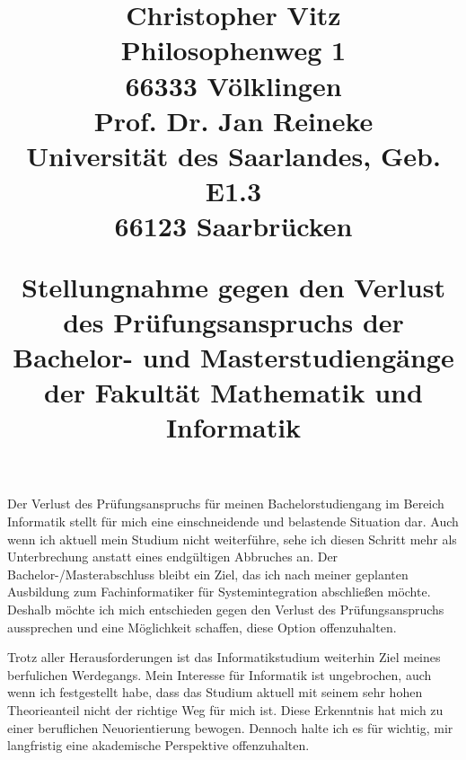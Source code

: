 \documentclass[a4paper,12pt]{article}
\title{
    \vspace{-2cm}
    \begin{flushleft}
        {\small
        Christopher Vitz\\
        Philosophenweg 1\\
        66333 Völklingen\\
        \vspace{1cm}
        Prof. Dr. Jan Reineke\\
        Universität des Saarlandes, Geb. E1.3\\
        66123 Saarbrücken\\
        }
    \end{flushleft}
    \vspace{1.5cm}
    \begin{center}
        Stellungnahme gegen den Verlust des Prüfungsanspruchs der Bachelor- und Masterstudiengänge der Fakultät Mathematik und Informatik
    \end{center}
    \vspace{-3cm}
}
\author{}
\date{}
\begin{document}
\maketitle
\vspace{1cm}
Der Verlust des Prüfungsanspruchs für meinen Bachelorstudiengang im Bereich Informatik stellt für mich eine einschneidende und belastende Situation dar.
Auch wenn ich aktuell mein Studium nicht weiterführe, sehe ich diesen Schritt mehr als Unterbrechung anstatt eines endgültigen Abbruches an.
Der Bachelor-/Masterabschluss bleibt ein Ziel, das ich nach meiner geplanten Ausbildung zum Fachinformatiker für Systemintegration abschließen möchte.
Deshalb möchte ich mich entschieden gegen den Verlust des Prüfungsanspruchs aussprechen und eine Möglichkeit schaffen, diese Option offenzuhalten.

Trotz aller Herausforderungen ist das Informatikstudium weiterhin Ziel meines berfulichen Werdegangs.
Mein Interesse für Informatik ist ungebrochen, auch wenn ich festgestellt habe, dass das Studium aktuell mit seinem sehr hohen Theorieanteil nicht der richtige Weg für mich ist.
Diese Erkenntnis hat mich zu einer beruflichen Neuorientierung bewogen.
Dennoch halte ich es für wichtig, mir langfristig eine akademische Perspektive offenzuhalten.
\end{document}
